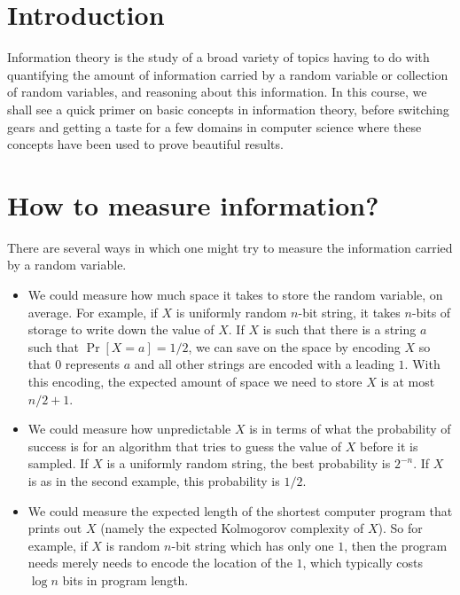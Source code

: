 \documentclass[10pt]{article}
\begin{document}



\section{Introduction}


Information theory is the study of a broad variety of topics having to do with quantifying the amount of information carried by a random variable or collection of random variables, and reasoning about this information. In this course, we shall see a quick primer on basic concepts in information theory, before switching gears and getting a taste for a few domains in computer science where these concepts have been used to prove beautiful results.

\section{How to measure information?}

There are several ways in which one might try to measure the information carried by a random variable.

\begin{itemize}
\item We could measure how much space it takes to store the random variable, on average. For example, if $X$ is uniformly random $n$-bit string, it takes $n$-bits of storage to write down the value of $X$. If $X$ is such that there is a string $a$ such that $\Pr[X=a]=1/2$, we can save on the space by encoding $X$ so that $0$ represents $a$ and all other strings are encoded with a leading $1$. With this encoding, the expected amount of space we need to store $X$ is at most $n/2 + 1$.
\item We could measure how unpredictable $X$ is in terms of what the probability of success is for an algorithm that tries to guess the value of $X$ before it is sampled. If $X$ is a uniformly random string, the best probability is $2^{-n}$. If $X$ is as in the second example, this probability is $1/2$.
\item We could measure the expected length of the shortest computer program that prints out $X$ (namely the expected Kolmogorov complexity of $X$). So for example, if $X$ is random $n$-bit string which has only one $1$, then the program needs merely needs to encode the location of the $1$, which typically costs $\log n$ bits in program length.
\end{itemize}
\end{document}
